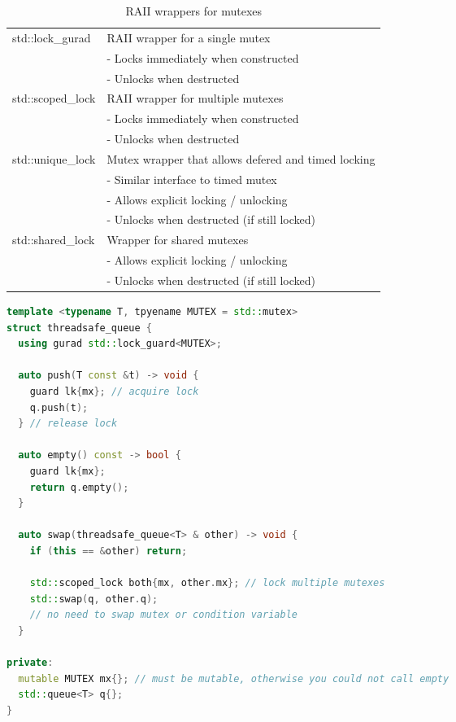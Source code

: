 \documentclass[11pt,twoside,landscape]{article}
\begin{document}
\begin{multicols}{2}
\begin{table}[htbp]
\caption{\label{tbl:raii-wrappers-for-mutexes}RAII wrappers for mutexes}
\centering
\begin{tabular}{|l|l|}
\hline
std::lock\_gurad & RAII wrapper for a single mutex \\
 & - Locks immediately when constructed \\
 & - Unlocks when destructed \\
\hline
std::scoped\_lock & RAII wrapper for multiple mutexes \\
 & - Locks immediately when constructed \\
 & - Unlocks when destructed \\
\hline
std::unique\_lock & Mutex wrapper that allows defered and timed locking \\
 & - Similar interface to timed mutex \\
 & - Allows explicit locking / unlocking \\
 & - Unlocks when destructed (if still locked) \\
\hline
std::shared\_lock & Wrapper for shared mutexes \\
 & - Allows explicit locking / unlocking \\
 & - Unlocks when destructed (if still locked) \\
\hline
\end{tabular}
\end{table}


\begin{lstlisting}[language=c++,label=lst:example-usage-for-raii-wrappers,caption={Example usage for RAII wrappers},captionpos=b,numbers=none]
template <typename T, tpyename MUTEX = std::mutex>
struct threadsafe_queue {
  using gurad std::lock_guard<MUTEX>;

  auto push(T const &t) -> void {
    guard lk{mx}; // acquire lock
    q.push(t);
  } // release lock

  auto empty() const -> bool {
    guard lk{mx};
    return q.empty();
  }

  auto swap(threadsafe_queue<T> & other) -> void {
    if (this == &other) return;

    std::scoped_lock both{mx, other.mx}; // lock multiple mutexes
    std::swap(q, other.q);
    // no need to swap mutex or condition variable
  }

private:
  mutable MUTEX mx{}; // must be mutable, otherwise you could not call empty
  std::queue<T> q{};
}
\end{lstlisting}


\end{multicols}
\end{document}
